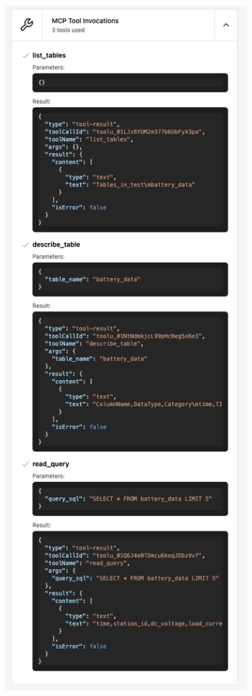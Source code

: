 \begin{figure}[H]
  \centering
  \begin{subfigure}{0.48\textwidth}
    \centering
    \includegraphics[width=\textwidth]{figures/screenshots/iotdb-demo/mcp-call.png}

\end{subfigure}
\end{figure}
